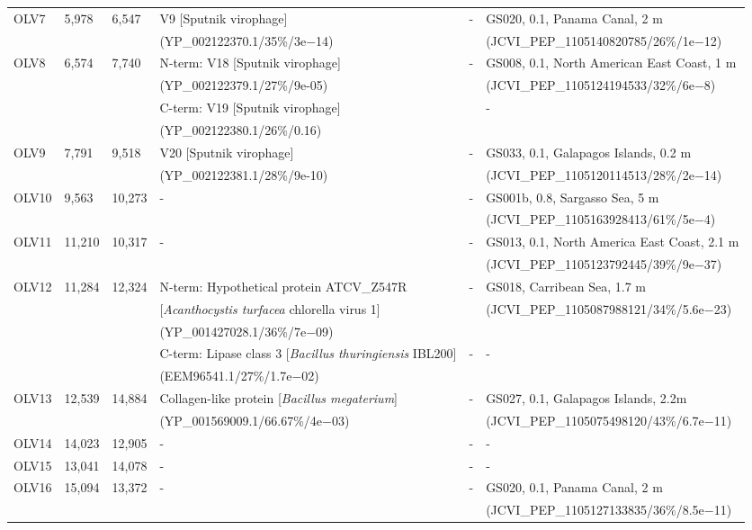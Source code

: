 \begin{landscape}
\begin{longtable}{p{0.7cm}p{0.7cm}p{0.7cm}p{8cm}p{5cm}p{7cm}}
OLV7 & 5,978 & 6,547 & V9 [Sputnik virophage] & - & GS020, 0.1, Panama Canal, 2 m \\
 &  &  & (YP\_002122370.1/35\%/3e$-$14) &  & (JCVI\_PEP\_1105140820785/26\%/1e$-$12) \\

OLV8 & 6,574 & 7,740 & N-term: V18 [Sputnik virophage]  & - &  GS008, 0.1, North American East Coast, 1 m \\
 &  &  &  (YP\_002122379.1/27\%/9e-05)  &  & (JCVI\_PEP\_1105124194533/32\%/6e$-$8) \\
 &  &  & C-term: V19 [Sputnik virophage] &  & - \\
 &  &  & (YP\_002122380.1/26\%/0.16) &  &  \\

OLV9 & 7,791 & 9,518 & V20 [Sputnik virophage] & - & GS033, 0.1, Galapagos Islands, 0.2 m \\
 &  &  & (YP\_002122381.1/28\%/9e-10) &  & (JCVI\_PEP\_1105120114513/28\%/2e$-$14) \\

OLV10 & 9,563 & 10,273 & - & - & GS001b, 0.8, Sargasso Sea, 5 m \\
 &  &  &  &  & (JCVI\_PEP\_1105163928413/61\%/5e$-$4) \\

OLV11 & 11,210 & 10,317 & - & - & GS013, 0.1, North America East Coast, 2.1 m \\
 &  &  &  &  & (JCVI\_PEP\_1105123792445/39\%/9e$-$37) \\

OLV12 & 11,284 & 12,324 & N-term: Hypothetical protein ATCV\_Z547R  & - & GS018, Carribean Sea, 1.7 m \\
 &  &  & [\emph{Acanthocystis turfacea} chlorella virus 1]  &  &  (JCVI\_PEP\_1105087988121/34\%/5.6e$-$23) \\
 &  &  & (YP\_001427028.1/36\%/7e$-$09)  &  &  \\
 &  &  & C-term: Lipase class 3 [\emph{Bacillus thuringiensis} IBL200]  & - & - \\
 &  &  & (EEM96541.1/27\%/1.7e$-$02)  &  &  \\


OLV13 & 12,539 & 14,884 & Collagen-like protein [\emph{Bacillus megaterium}] & - & GS027, 0.1, Galapagos Islands, 2.2m \\
 &  &  &  (YP\_001569009.1/66.67\%/4e$-$03) &  & (JCVI\_PEP\_1105075498120/43\%/6.7e$-$11) \\

OLV14 & 14,023 & 12,905 & - & - & - \\
OLV15 & 13,041 & 14,078 & - & - & - \\
OLV16 & 15,094 & 13,372 & - & - & GS020, 0.1, Panama Canal, 2 m \\
 &  &  &  &  & (JCVI\_PEP\_1105127133835/36\%/8.5e$-$11) \\


\end{longtable}
\end{landscape}
